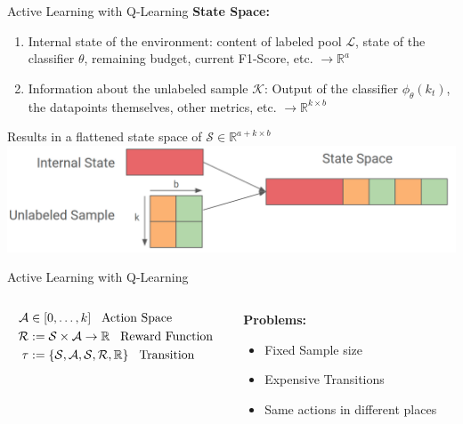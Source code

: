 \documentclass[aspectratio=169, 11pt, invertlogo]{ismll-slides}
\begin{document}

\begin{frame}[fragile]{Active Learning with Q-Learning}
	\textbf{State Space:} \\ [2mm]
	\begin{enumerate}
		\item Internal state of the environment: content of labeled pool $\mathcal{L}$, state of the classifier $\theta$, remaining budget, current F1-Score, etc. $\rightarrow \mathbb{R}^{a}$
		\item Information about the unlabeled sample $\mathcal{K}$: Output of the classifier $\phi_\theta(k_t)$, the datapoints themselves, other metrics, etc. $\rightarrow \mathbb{R}^{k \times b}$
	\end{enumerate}
	Results in a flattened state space of $\mathcal{S} \in \mathbb{R}^{a + k \times b}$ \\
	\includegraphics[width=.9\linewidth]{pics/state_space}
\end{frame}



\begin{frame}[fragile]{Active Learning with Q-Learning}
\begin{columns}
	\begin{column}{.4\linewidth}
		\begin{align*}
		\mathcal{A} &\in [0, \ldots, k] \hspace{3mm}\text{Action Space} \\
		\mathcal{R} &:= \mathcal{S} \times \mathcal{A} \rightarrow \mathbb{R} \hspace{3mm}\text{Reward Function} \\
		\tau &:= \{ \mathcal{S}, \mathcal{A}, \mathcal{S}, \mathcal{R}, \mathbb{R} \} \hspace{3mm}\text{Transition} \\
		\end{align*}
	\end{column}
	\begin{column}{.4\linewidth}
		\textbf{Problems:}
		\begin{itemize}
			\item Fixed Sample size
			\item Expensive Transitions
			\item Same actions in different places
		\end{itemize}
	\end{column}
\end{columns}
\end{frame}
\end{document}
